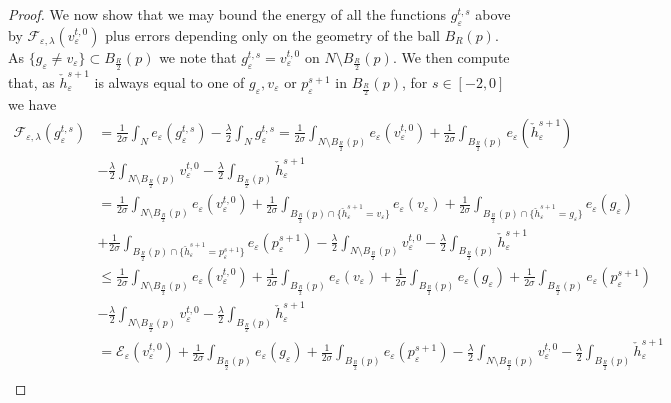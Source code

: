\documentclass[11pt]{article}
\begin{document}
\begin{proof}
We now show that we may bound the energy of all the functions $g^{t,s}_\varepsilon$ above by $\mathcal{F}_{\varepsilon,\lambda}(v^{t,0}_\varepsilon)$ plus errors depending only on the geometry of the ball $B_R(p)$. As $\{ g_\varepsilon \neq v_\varepsilon \} \subset B_{\frac{R}{2}}(p)$ we note that $g^{t,s}_\varepsilon = v^{t,0}_\varepsilon$ on $N \setminus B_{\frac{R}{2}}(p)$. We then compute that, as $\check{h}^{s+1}_\varepsilon$ is always equal to one of $g_\varepsilon,v_\varepsilon$ or $p_\varepsilon^{s+1}$ in $B_{\frac{R}{2}}(p)$, for $s \in [-2,0]$ we have
\begin{align*}
   \mathcal{F}_{\varepsilon,\lambda}(g^{t,s}_\varepsilon) &= \frac{1}{2\sigma}\int_N e_\varepsilon(g^{t,s}_\varepsilon) - \frac{\lambda}{2}\int_N g^{t,s}_\varepsilon = \frac{1}{2\sigma}\int_{N \setminus B_{\frac{R}{2}}(p)} e_\varepsilon(v^{t,0}_\varepsilon) + \frac{1}{2\sigma}\int_{B_{\frac{R}{2}}(p)} e_\varepsilon(\check{h}^{s+1}_\varepsilon)\\
   &- \frac{\lambda}{2}\int_{N \setminus B_{\frac{R}{2}}(p)} v^{t,0}_\varepsilon  - \frac{\lambda}{2}\int_{B_{\frac{R}{2}}(p)} \check{h}^{s+1}_\varepsilon\\
    &= \frac{1}{2\sigma}\int_{N \setminus B_{\frac{R}{2}}(p)} e_\varepsilon(v^{t,0}_\varepsilon) + \frac{1}{2\sigma}\int_{B_{\frac{R}{2}}(p) \cap \{\check{h}^{s+1}_\varepsilon = v_\varepsilon\}} e_\varepsilon(v_\varepsilon) + \frac{1}{2\sigma}\int_{B_{\frac{R}{2}}(p) \cap \{\check{h}^{s+1}_\varepsilon = g_\varepsilon\}} e_\varepsilon(g_\varepsilon)  \\
    &+ \frac{1}{2\sigma}\int_{B_{\frac{R}{2}}(p) \cap \{\check{h}^{s+1}_\varepsilon = p^{s+1}_\varepsilon\}} e_\varepsilon(p^{s+1}_\varepsilon) -\frac{\lambda}{2}\int_{N \setminus B_{\frac{R}{2}}(p)} v^{t,0}_\varepsilon  - \frac{\lambda}{2}\int_{B_{\frac{R}{2}}(p)} \check{h}^{s+1}_\varepsilon\\
    &\leq \frac{1}{2\sigma}\int_{N \setminus B_{\frac{R}{2}}(p)} e_\varepsilon(v^{t,0}_\varepsilon) + \frac{1}{2\sigma}\int_{B_{\frac{R}{2}}(p)} e_\varepsilon(v_\varepsilon)  + \frac{1}{2\sigma}\int_{B_{\frac{R}{2}}(p)} e_\varepsilon(g_\varepsilon) + \frac{1}{2\sigma}\int_{B_{\frac{R}{2}}(p)} e_\varepsilon(p^{s+1}_\varepsilon)\\
    &-\frac{\lambda}{2}\int_{N \setminus B_{\frac{R}{2}}(p)} v^{t,0}_\varepsilon  - \frac{\lambda}{2}\int_{B_{\frac{R}{2}}(p)} \check{h}^{s+1}_\varepsilon\\
    &= \mathcal{E}_\varepsilon(v^{t,0}_\varepsilon) + \frac{1}{2\sigma}\int_{B_{\frac{R}{2}}(p)} e_\varepsilon(g_\varepsilon) + \frac{1}{2\sigma}\int_{B_{\frac{R}{2}}(p)} e_\varepsilon(p^{s+1}_\varepsilon) -\frac{\lambda}{2}\int_{N \setminus B_{\frac{R}{2}}(p)} v^{t,0}_\varepsilon  - \frac{\lambda}{2}\int_{B_{\frac{R}{2}}(p)} \check{h}^{s+1}_\varepsilon\\

\end{align*}
\end{proof}
\end{document}
